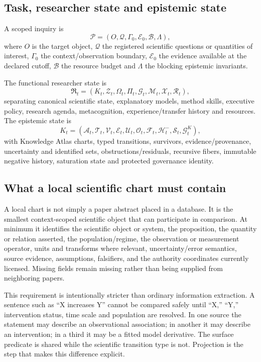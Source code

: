 \subsection{Task, researcher state and epistemic state}
A scoped inquiry is
\begin{equation}\mathcal P=(O,\mathcal Q,\Gamma_0,\mathcal E_0,\mathcal B,\Lambda),\end{equation}
where $O$ is the target object, $\mathcal Q$ the registered scientific questions or quantities of interest, $\Gamma_0$ the context/observation boundary, $\mathcal E_0$ the evidence available at the declared cutoff, $\mathcal B$ the resource budget and $\Lambda$ the blocking epistemic invariants.

The functional researcher state is
\begin{equation}\mathfrak R_t=(K_t,\mathcal Z_t,\Omega_t,\Pi_t,\mathcal G_t,\mathcal M_t,\mathcal X_t,\mathcal R_t),\end{equation}
separating canonical scientific state, explanatory models, method skills, executive policy, research agenda, metacognition, experience/transfer history and resources. The epistemic state is
\begin{equation}K_t=(\mathcal A_t,\mathcal T_t,\mathcal V_t,\mathcal E_t,\mathcal U_t,\mathcal O_t,\mathcal F_t,\mathcal H_t^{-},\mathcal S_t,\mathcal G_t^K),\end{equation}
with Knowledge Atlas charts, typed transitions, survivors, evidence/provenance, uncertainty and identified sets, obstructions/residuals, recursive fibers, immutable negative history, saturation state and protected governance identity.

\subsection{What a local scientific chart must contain}

A local chart is not simply a paper abstract placed in a database. It is the smallest context-scoped scientific object that can participate in comparison. At minimum it identifies the scientific object or system, the proposition, the quantity or relation asserted, the population/regime, the observation or measurement operator, units and transforms where relevant, uncertainty/error semantics, source evidence, assumptions, falsifiers, and the authority coordinates currently licensed. Missing fields remain missing rather than being supplied from neighboring papers.

This requirement is intentionally stricter than ordinary information extraction. A sentence such as ``X increases Y'' cannot be compared safely until ``X,'' ``Y,'' intervention status, time scale and population are resolved. In one source the statement may describe an observational association; in another it may describe an intervention; in a third it may be a fitted model derivative. The surface predicate is shared while the scientific transition type is not. Projection is the step that makes this difference explicit.

